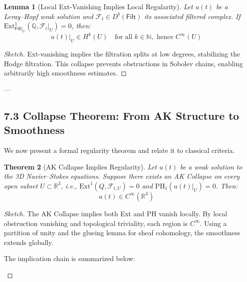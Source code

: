 \documentclass[11pt]{article}
\newtheorem{theorem}{Theorem}[section]
\newtheorem{lemma}[theorem]{Lemma}
\theoremstyle{definition}
\begin{document}
\begin{lemma}[Local Ext-Vanishing Implies Local Regularity]
Let \( u(t) \) be a Leray–Hopf weak solution and \( \mathcal{F}_t \in D^b(\mathsf{Filt}) \) its associated filtered complex.  
If \( \mathrm{Ext}^1_{\mathsf{Filt}|_U}(\mathbb{Q}, \mathcal{F}_t|_U) = 0 \), then:
\[
u(t)|_U \in H^k(U) \quad \text{for all } k \in \mathbb{N}, \text{ hence } C^\infty(U)
\]
\end{lemma}

\begin{proof}[Sketch]
Ext-vanishing implies the filtration splits at low degrees, stabilizing the Hodge filtration.  
This collapse prevents obstructions in Sobolev chains, enabling arbitrarily high smoothness estimates.
\end{proof}

---

\subsection*{7.3 Collapse Theorem: From AK Structure to Smoothness}

We now present a formal regularity theorem and relate it to classical criteria.

\begin{theorem}[AK Collapse Implies Regularity]
Let \( u(t) \) be a weak solution to the 3D Navier–Stokes equations.  
Suppose there exists an AK Collapse on every open subset \( U \subset \mathbb{R}^3 \),  
i.e., $\mathrm{Ext}^1(Q, \mathcal{F}_{t,U}) = 0$ and $\mathrm{PH}_1(u(t)|_U) = 0$. Then:
\[
u(t) \in C^\infty(\mathbb{R}^3)
\]
\end{theorem}

\begin{proof}[Sketch]
The AK Collapse implies both Ext and PH vanish locally.  
By local obstruction vanishing and topological triviality, each region is $C^\infty$.  
Using a partition of unity and the glueing lemma for sheaf cohomology, the smoothness extends globally.

\medskip
The implication chain is summarized below:

\begin{center}
\end{center}
\end{proof}
\end{document}
